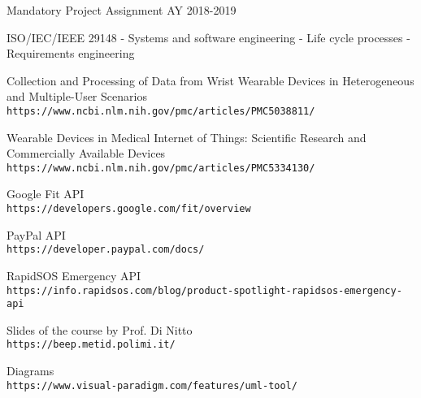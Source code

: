 \documentclass[../DD0.tex]{subfiles}
\begin{document}
\begin{thebibliography}{9}
   Mandatory Project Assignment AY 2018-2019


   ISO/IEC/IEEE 29148 - Systems and software engineering - Life cycle processes - Requirements engineering

   Collection and Processing of Data from Wrist Wearable Devices in Heterogeneous and Multiple-User Scenarios\\
  \texttt{https://www.ncbi.nlm.nih.gov/pmc/articles/PMC5038811/}

   Wearable Devices in Medical Internet of Things: Scientific Research and Commercially Available Devices\\
  \texttt{https://www.ncbi.nlm.nih.gov/pmc/articles/PMC5334130/}


   Google Fit API\\
  \texttt{https://developers.google.com/fit/overview}

   PayPal API\\
  \texttt{https://developer.paypal.com/docs/}

   RapidSOS Emergency API\\
  \texttt{https://info.rapidsos.com/blog/product-spotlight-rapidsos-emergency-api}

  Slides of the course by Prof. Di Nitto\\
  \texttt{https://beep.metid.polimi.it/}

  Diagrams\\
  \texttt{https://www.visual-paradigm.com/features/uml-tool/}

\end{thebibliography}
\end{document}

